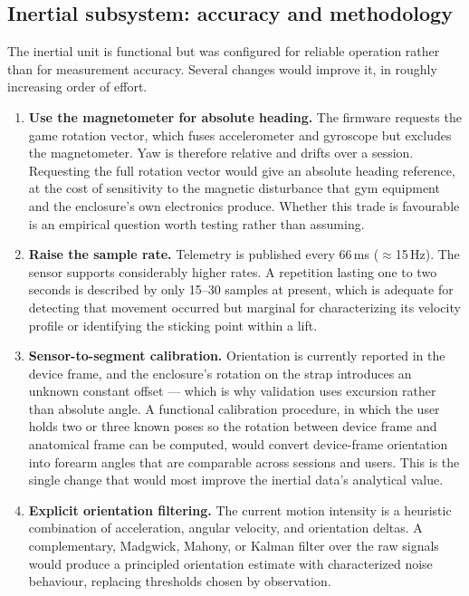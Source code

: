 \documentclass[11pt,a4paper]{article}
\begin{document}
\subsection{Inertial subsystem: accuracy and methodology}

The inertial unit is functional but was configured for reliable operation rather
than for measurement accuracy. Several changes would improve it, in roughly
increasing order of effort.

\begin{enumerate}
\item \textbf{Use the magnetometer for absolute heading.} The firmware requests
the game rotation vector, which fuses accelerometer and gyroscope but excludes
the magnetometer. Yaw is therefore relative and drifts over a session. Requesting
the full rotation vector would give an absolute heading reference, at the cost of
sensitivity to the magnetic disturbance that gym equipment and the enclosure's
own electronics produce. Whether this trade is favourable is an empirical
question worth testing rather than assuming.

\item \textbf{Raise the sample rate.} Telemetry is published every 66\,ms
($\approx$15\,Hz). The sensor supports considerably higher rates. A repetition
lasting one to two seconds is described by only 15--30 samples at present, which
is adequate for detecting that movement occurred but marginal for characterizing
its velocity profile or identifying the sticking point within a lift.

\item \textbf{Sensor-to-segment calibration.} Orientation is currently reported
in the device frame, and the enclosure's rotation on the strap introduces an
unknown constant offset --- which is why validation uses excursion rather than
absolute angle. A functional calibration procedure, in which the user holds two
or three known poses so the rotation between device frame and anatomical frame
can be computed, would convert device-frame orientation into forearm angles that
are comparable across sessions and users. This is the single change that would
most improve the inertial data's analytical value.

\item \textbf{Explicit orientation filtering.} The current motion intensity is a
heuristic combination of acceleration, angular velocity, and orientation deltas.
A complementary, Madgwick, Mahony, or Kalman filter over the raw signals would
produce a principled orientation estimate with characterized noise behaviour,
replacing thresholds chosen by observation.


\end{enumerate}
\end{document}
